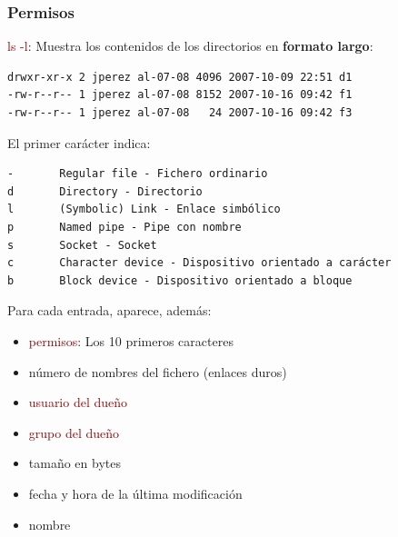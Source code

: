 \documentclass[ucs]{beamer}
\newcommand{\res}[1]{\textcolor{darkred}{#1}}
\begin{document}
\begin{frame}[fragile]
  \frametitle{Permisos}
  \res{ls -l}: Muestra los contenidos de los directorios en
    \textbf{formato largo}:
\begin{verbatim}
drwxr-xr-x 2 jperez al-07-08 4096 2007-10-09 22:51 d1
-rw-r--r-- 1 jperez al-07-08 8152 2007-10-16 09:42 f1
-rw-r--r-- 1 jperez al-07-08   24 2007-10-16 09:42 f3
\end{verbatim}


El primer carácter indica:

  \begin{footnotesize}
  \begin{verbatim}
-       Regular file - Fichero ordinario
d       Directory - Directorio
l       (Symbolic) Link - Enlace simbólico
p       Named pipe - Pipe con nombre
s       Socket - Socket
c       Character device - Dispositivo orientado a carácter
b       Block device - Dispositivo orientado a bloque
  \end{verbatim}
  \end{footnotesize}


\end{frame}
\begin{frame}[fragile]

    Para cada entrada, aparece, además:
    \begin{footnotesize}
      \begin{itemize}
      \item \res{permisos}: Los 10 primeros caracteres
      \item número de nombres del fichero (enlaces duros)
      \item \res{usuario del dueño}
      \item \res{grupo del dueño}
      \item tamaño en bytes
      \item fecha y hora de la última modificación
      \item nombre
      \end{itemize}
    \end{footnotesize}
\end{frame}
\end{document}

